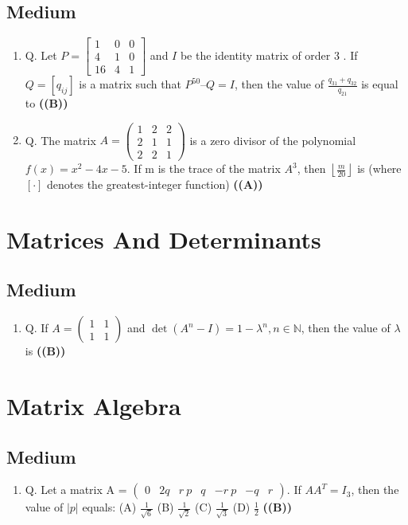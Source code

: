 \documentclass{article}
\begin{document}
\subsection{Medium}
\begin{enumerate}
\item Q. Let $P = \begin{bmatrix} 1 & 0 & 0 \\ 4 & 1 & 0 \\ 16 & 4 & 1 \end{bmatrix}$ and $I$ be the identity matrix of order 3 . If $Q = [q_{ij}]$ is a matrix such that $P^{50} – Q = I$, then the value of $\frac{q_{31}+q_{32}}{q_{21}}$ is equal to \hfill \textbf{((B))}
\item Q. The matrix $A = \begin{pmatrix} 1 & 2 & 2 \\ 2 & 1 & 1 \\ 2 & 2 & 1 \end{pmatrix}$ is a zero divisor of the polynomial $f(x) = x^2 - 4x - 5$. If m is the trace of the matrix $A^3$, then $\left\lfloor\frac{m}{20}\right\rfloor$ is (where $[\cdot]$ denotes the greatest-integer function) \hfill \textbf{((A))}
\end{enumerate}
\section{Matrices And Determinants}
\subsection{Medium}
\begin{enumerate}
\item Q. If $A = \begin{pmatrix} 1 & 1 \\ 1 & 1 \end{pmatrix}$ and $\det (A^n - I) = 1 - \lambda^n, n \in \mathbb{N}$, then the value of $\lambda$ is \hfill \textbf{((B))}
\end{enumerate}
\section{Matrix Algebra}
\subsection{Medium}
\begin{enumerate}
\item Q. Let a matrix A = $\begin{pmatrix} 0 & 2q & r \ p & q & -r \ p & -q & r \end{pmatrix}$. If $AA^T = I_3$, then the value of $|p|$ equals:
(A) $\frac{1}{\sqrt{6}}$
(B) $\frac{1}{\sqrt{2}}$
(C) $\frac{1}{\sqrt{3}}$
(D) $\frac{1}{2}$ \hfill \textbf{((B))}
\end{enumerate}
\end{document}
